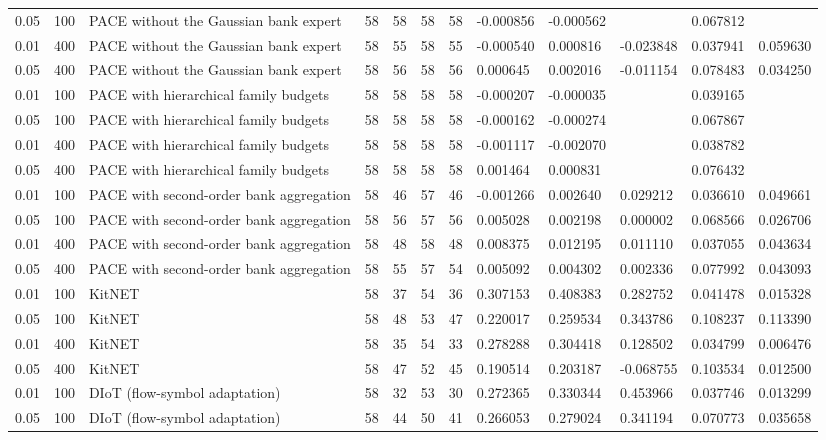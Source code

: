 \begin{tabular}{llllllllllll}
0.05 & 100 & PACE without the Gaussian bank expert & 58 & 58 & 58 & 58 & -0.000856 & -0.000562 &  & 0.067812 &  \\
0.01 & 400 & PACE without the Gaussian bank expert & 58 & 55 & 58 & 55 & -0.000540 & 0.000816 & -0.023848 & 0.037941 & 0.059630 \\
0.05 & 400 & PACE without the Gaussian bank expert & 58 & 56 & 58 & 56 & 0.000645 & 0.002016 & -0.011154 & 0.078483 & 0.034250 \\
0.01 & 100 & PACE with hierarchical family budgets & 58 & 58 & 58 & 58 & -0.000207 & -0.000035 &  & 0.039165 &  \\
0.05 & 100 & PACE with hierarchical family budgets & 58 & 58 & 58 & 58 & -0.000162 & -0.000274 &  & 0.067867 &  \\
0.01 & 400 & PACE with hierarchical family budgets & 58 & 58 & 58 & 58 & -0.001117 & -0.002070 &  & 0.038782 &  \\
0.05 & 400 & PACE with hierarchical family budgets & 58 & 58 & 58 & 58 & 0.001464 & 0.000831 &  & 0.076432 &  \\
0.01 & 100 & PACE with second-order bank aggregation & 58 & 46 & 57 & 46 & -0.001266 & 0.002640 & 0.029212 & 0.036610 & 0.049661 \\
0.05 & 100 & PACE with second-order bank aggregation & 58 & 56 & 57 & 56 & 0.005028 & 0.002198 & 0.000002 & 0.068566 & 0.026706 \\
0.01 & 400 & PACE with second-order bank aggregation & 58 & 48 & 58 & 48 & 0.008375 & 0.012195 & 0.011110 & 0.037055 & 0.043634 \\
0.05 & 400 & PACE with second-order bank aggregation & 58 & 55 & 57 & 54 & 0.005092 & 0.004302 & 0.002336 & 0.077992 & 0.043093 \\
0.01 & 100 & KitNET & 58 & 37 & 54 & 36 & 0.307153 & 0.408383 & 0.282752 & 0.041478 & 0.015328 \\
0.05 & 100 & KitNET & 58 & 48 & 53 & 47 & 0.220017 & 0.259534 & 0.343786 & 0.108237 & 0.113390 \\
0.01 & 400 & KitNET & 58 & 35 & 54 & 33 & 0.278288 & 0.304418 & 0.128502 & 0.034799 & 0.006476 \\
0.05 & 400 & KitNET & 58 & 47 & 52 & 45 & 0.190514 & 0.203187 & -0.068755 & 0.103534 & 0.012500 \\
0.01 & 100 & DIoT (flow-symbol adaptation) & 58 & 32 & 53 & 30 & 0.272365 & 0.330344 & 0.453966 & 0.037746 & 0.013299 \\
0.05 & 100 & DIoT (flow-symbol adaptation) & 58 & 44 & 50 & 41 & 0.266053 & 0.279024 & 0.341194 & 0.070773 & 0.035658 \\

\end{tabular}
